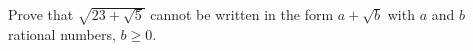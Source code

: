 Prove that $\sqrt{23+\sqrt5}$ cannot be written in the form $a+\sqrt b$ with $a$ and $b$ rational numbers, $b\ge0$.
